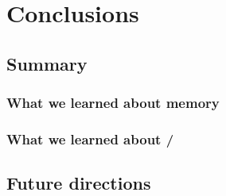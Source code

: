 \acresetall
\chapter{Conclusions}
\label{ch:conclusions}
\section{Summary}

\subsection{What we learned about memory}

\subsection{What we learned about \scz/}

\section{Future directions}